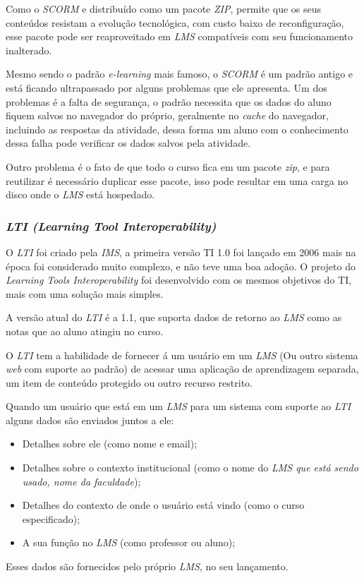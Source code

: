 Como o \textit{SCORM} e distribuído como um pacote \textit{ZIP}, permite que os seus conteúdos resistam a evolução tecnológica, com custo baixo de reconfiguração, esse pacote pode ser reaproveitado em \textit{LMS} compatíveis com seu funcionamento inalterado.

Mesmo sendo o padrão \textit{e-learning} mais famoso, o \textit{SCORM} é um padrão antigo e está ficando ultrapassado por alguns problemas que ele apresenta. Um dos problemas é a falta de segurança, o padrão necessita que os dados do aluno fiquem salvos no navegador do próprio, geralmente no \textit{cache} do navegador, incluindo as respostas da atividade, dessa forma um aluno com o conhecimento dessa falha pode verificar os dados salvos pela atividade.

Outro problema é o fato de que todo o curso fica em um pacote \textit{zip}, e para reutilizar é necessário duplicar esse pacote, isso pode resultar em uma carga no disco onde o \textit{LMS} está hospedado.

\subsubsection{\textit{LTI (Learning Tool Interoperability)}}
\label{sec:lti}

O \textit{LTI} foi criado pela \textit{IMS}, a primeira versão TI 1.0 foi lançado em 2006 mais na época foi considerado muito complexo, e não teve uma boa adoção. O projeto do \textit{Learning Tools Interoperability} foi desenvolvido com os mesmos objetivos do TI, mais com uma solução mais simples. \cite{ims}

A versão atual do \textit{LTI} é a 1.1, que suporta dados de retorno ao \textit{LMS} como as notas que ao aluno atingiu no curso.

\begin{citacao}
  O \textit{LTI} tem a habilidade de fornecer á um usuário em um \textit{LMS} (Ou outro sistema \textit{web} com suporte ao padrão) de acessar uma aplicação de aprendizagem separada, um item de conteúdo protegido ou outro recurso restrito. \cite[p.~2, tradução nossa]{vickers-ims}
\end{citacao}

Quando um usuário que está em um \textit{LMS} para um sistema com suporte ao \textit{LTI} alguns dados são enviados juntos a ele:
\begin{itemize}
    \item Detalhes sobre ele (como nome e email);
    \item Detalhes sobre o contexto institucional (como o nome do \textit{LMS que está sendo usado, nome da faculdade});
    \item Detalhes do contexto de onde o usuário está vindo (como o curso especificado);
    \item A sua função no \textit{LMS} (como professor ou aluno);
\end{itemize}
Esses dados são fornecidos pelo próprio \textit{LMS}, no seu lançamento.

